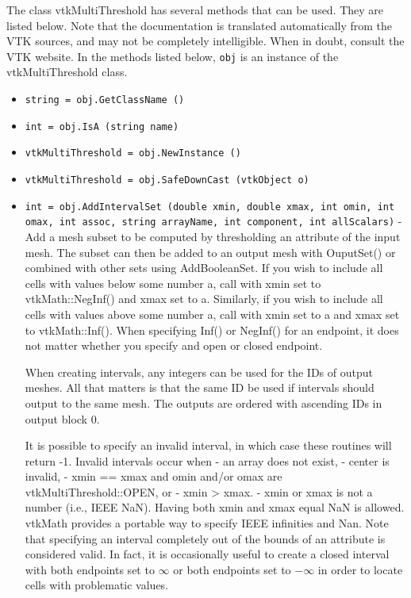 The class vtkMultiThreshold has several methods that can be used.
  They are listed below.
Note that the documentation is translated automatically from the VTK sources,
and may not be completely intelligible.  When in doubt, consult the VTK website.
In the methods listed below, \verb|obj| is an instance of the vtkMultiThreshold class.
\begin{itemize}
\item  \verb|string = obj.GetClassName ()|

\item  \verb|int = obj.IsA (string name)|

\item  \verb|vtkMultiThreshold = obj.NewInstance ()|

\item  \verb|vtkMultiThreshold = obj.SafeDownCast (vtkObject o)|

\item  \verb|int = obj.AddIntervalSet (double xmin, double xmax, int omin, int omax, int assoc, string arrayName, int component, int allScalars)| -  Add a mesh subset to be computed by thresholding an attribute of the input mesh.
 The subset can then be added to an output mesh with OuputSet() or combined with other sets using AddBooleanSet.
 If you wish to include all cells with values below some number  a, call
 with xmin set to vtkMath::NegInf() and xmax set to  a.
 Similarly, if you wish to include all cells with values above some number  a,
 call with xmin set to  a and xmax set to vtkMath::Inf().
 When specifying Inf() or NegInf() for an endpoint, it does not matter whether
 you specify and open or closed endpoint.
 
 When creating intervals, any integers can be used for the IDs of output meshes.
 All that matters is that the same ID be used if intervals should output to the same mesh.
 The outputs are ordered with ascending IDs in output block 0.

 It is possible to specify an invalid interval, in which case these routines will return -1.
 Invalid intervals occur when
 - an array does not exist,
 -  center is invalid,
 -  xmin ==  xmax and  omin and/or  omax are vtkMultiThreshold::OPEN, or
 -  xmin >  xmax.
 -  xmin or  xmax is not a number (i.e., IEEE NaN). Having both  xmin and  xmax equal NaN is allowed.
 vtkMath provides a portable way to specify IEEE infinities and Nan.
 Note that specifying an interval completely out of the bounds of an attribute is considered valid.
 In fact, it is occasionally useful to create a closed interval with both endpoints set to $\infty$
 or both endpoints set to $-\infty$ in order to locate cells with problematic values.


\end{itemize}

